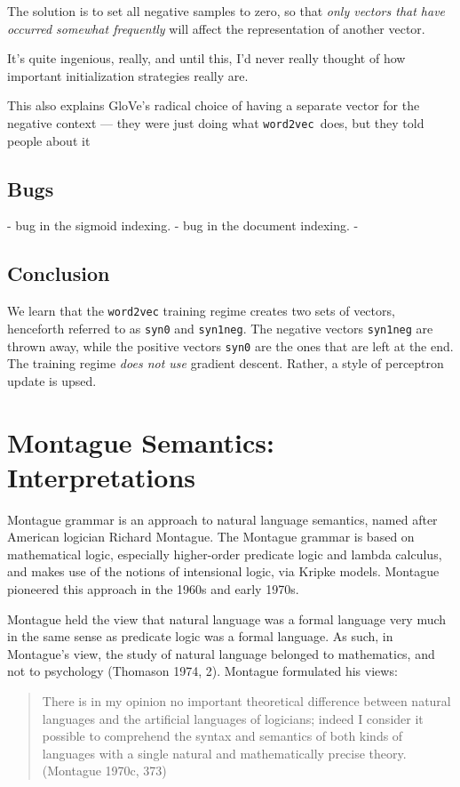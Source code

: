 \documentclass[11pt]{book}
\newcommand{\wtov}{\texttt{word2vec }}
\begin{document}
The solution is to set all negative samples to zero, so that 
\emph{only vectors that have occurred somewhat frequently} will affect the representation 
of another vector.

It's quite ingenious, really, and until this, I'd never really thought of
how important initialization strategies really are.


This also explains GloVe's radical choice of having a separate vector
for the negative context --- they were just doing what \wtov does, but
they told people about it 

\section{Bugs}

- bug in the sigmoid indexing.
- bug in the document indexing.
- 

\section{Conclusion}

We learn that the \texttt{word2vec} training regime creates two sets of vectors, henceforth
referred to as \texttt{syn0} and \texttt{syn1neg}. The negative vectors \texttt{syn1neg} are thrown away, while the positive vectors \texttt{syn0} are the ones that are left at the end. The training regime \emph{does not use} gradient descent. Rather, a style of perceptron update is upsed. 

\chapter{Montague Semantics: Interpretations}

Montague grammar is an approach to natural language semantics, named after
American logician Richard Montague. The Montague grammar is based on
mathematical logic, especially higher-order predicate logic and lambda
calculus, and makes use of the notions of intensional logic, via Kripke models.
Montague pioneered this approach in the 1960s and early 1970s.

Montague held the view that natural language was a formal language very much in the same sense as predicate logic was a formal language. As such, in Montague’s view, the study of natural language belonged to mathematics, and not to psychology (Thomason 1974, 2). Montague formulated his views: %


\begin{quote}
	There is in my opinion no important theoretical difference between natural languages and the artificial languages of logicians; indeed I consider it possible to comprehend the syntax and semantics of both kinds of languages with a single natural and mathematically precise theory. (Montague 1970c, 373)
\end{quote}
\end{document}
